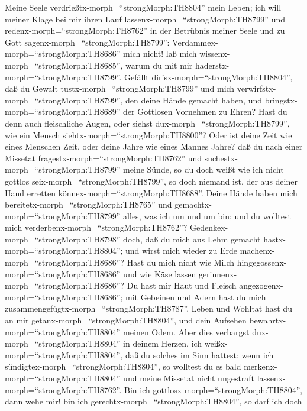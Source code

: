  Meine Seele verdrießtx-morph=``strongMorph:TH8804'' mein
Leben; ich will meiner Klage bei mir ihren Lauf
lassenx-morph=``strongMorph:TH8799'' und
redenx-morph=``strongMorph:TH8762'' in der Betrübnis meiner Seele
 und zu Gott sagenx-morph=``strongMorph:TH8799'':
Verdammex-morph=``strongMorph:TH8686'' mich nicht! laß mich
wissenx-morph=``strongMorph:TH8685'', warum du mit mir
haderstx-morph=``strongMorph:TH8799''.  Gefällt
dir'sx-morph=``strongMorph:TH8804'', daß du Gewalt
tustx-morph=``strongMorph:TH8799'' und mich
verwirfstx-morph=``strongMorph:TH8799'', den deine Hände gemacht haben,
und bringstx-morph=``strongMorph:TH8689'' der Gottlosen Vornehmen zu
Ehren?  Hast du denn auch fleischliche Augen, oder siehst
dux-morph=``strongMorph:TH8799'', wie ein Mensch
siehtx-morph=``strongMorph:TH8800''?  Oder ist deine Zeit
wie eines Menschen Zeit, oder deine Jahre wie eines Mannes Jahre?
 daß du nach einer Missetat
fragestx-morph=``strongMorph:TH8762'' und
suchestx-morph=``strongMorph:TH8799'' meine Sünde,  so du
doch weißt wie ich nicht gottlos seix-morph=``strongMorph:TH8799'', so
doch niemand ist, der aus deiner Hand erretten
könnex-morph=``strongMorph:TH8688''.  Deine Hände haben mich
bereitetx-morph=``strongMorph:TH8765'' und
gemachtx-morph=``strongMorph:TH8799'' alles, was ich um und um bin; und
du wolltest mich verderbenx-morph=``strongMorph:TH8762''? 
Gedenkex-morph=``strongMorph:TH8798'' doch, daß du mich aus Lehm gemacht
hastx-morph=``strongMorph:TH8804''; und wirst mich wieder zu Erde
machenx-morph=``strongMorph:TH8686''?  Hast du mich nicht
wie Milch hingegossenx-morph=``strongMorph:TH8686'' und wie Käse lassen
gerinnenx-morph=``strongMorph:TH8686''?  Du hast mir Haut
und Fleisch angezogenx-morph=``strongMorph:TH8686''; mit Gebeinen und
Adern hast du mich zusammengefügtx-morph=``strongMorph:TH8787''.
 Leben und Wohltat hast du an mir
getanx-morph=``strongMorph:TH8804'', und dein Aufsehen
bewahrtx-morph=``strongMorph:TH8804'' meinen Odem.  Aber
dies verbargst dux-morph=``strongMorph:TH8804'' in deinem Herzen, ich
weißx-morph=``strongMorph:TH8804'', daß du solches im Sinn hattest:
 wenn ich sündigtex-morph=``strongMorph:TH8804'', so
wolltest du es bald merkenx-morph=``strongMorph:TH8804'' und meine
Missetat nicht ungestraft lassenx-morph=``strongMorph:TH8762''.
 Bin ich gottlosx-morph=``strongMorph:TH8804'', dann wehe
mir! bin ich gerechtx-morph=``strongMorph:TH8804'', so darf ich doch
